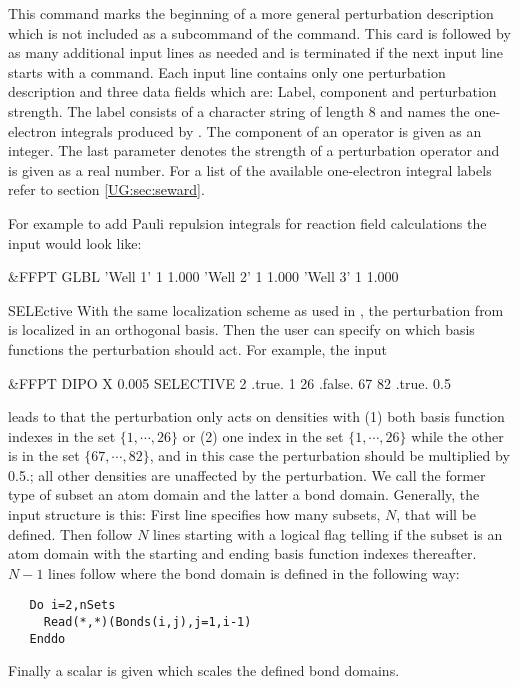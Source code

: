 \begin{keywordlist}
This command marks the beginning of a more general perturbation
description which is not included as a subcommand of the
 command.
This card is followed by as many additional input lines as needed and
is terminated if the next input line starts with a command. Each input
line contains only one perturbation description and three data fields
which are: Label, component and perturbation strength. The label
consists of a character string of length 8 and names the one-{}
electron integrals produced by . The component of
an operator is given as an integer. The last parameter denotes
the strength of a perturbation operator and is given as a real number.
For a list of the available one-{}electron integral labels refer to
section \ref{UG:sec:seward}.

For example to add Pauli repulsion integrals for
reaction field calculations the input would look like:
\begin{inputlisting}
 &FFPT
GLBL
 'Well   1' 1 1.000
 'Well   2' 1 1.000
 'Well   3' 1 1.000
\end{inputlisting}
\item[SELEctive]
With the same localization scheme as used in , the perturbation
from  is localized in an orthogonal basis. Then the user can
specify on which basis functions the perturbation should act.
For example, the input
\begin{inputlisting}
 &FFPT
DIPO
X 0.005
SELECTIVE
2
.true. 1 26
.false. 67 82
.true.
0.5
\end{inputlisting}
leads to that the perturbation only acts on densities with (1) both basis
function indexes in the set $\{1,\cdots,26\}$ or (2) one index
in the set $\{1,\cdots,26\}$ while the other is in the set
$\{67,\cdots,82\}$, and in this case the perturbation should be multiplied
by 0.5.; all other densities are unaffected by the perturbation.
We call the former type of subset an atom domain and the latter a bond
domain. Generally, the input structure is this: First line specifies how
many subsets, $N$, that will be defined. Then follow $N$ lines starting
with a logical flag telling if the subset is an atom domain with the starting
and ending basis function indexes thereafter. $N-1$ lines follow where the
bond domain is defined in the following way:
\begin{verbatim}
   Do i=2,nSets
     Read(*,*)(Bonds(i,j),j=1,i-1)
   Enddo
\end{verbatim}
Finally a scalar is given which scales the defined bond domains.


\end{keywordlist}
